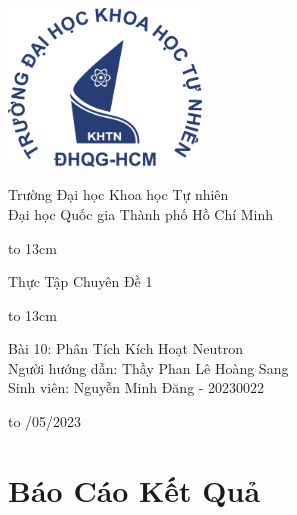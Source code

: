 \documentclass{article}
\begin{document}
\onehalfspacing
{
   \setlength{\topmargin}{-0.5cm}
\begin{titlepage}
  \begin{center}
    \centerline{\includegraphics[height=42mm]{logo}}

    
   \vspace{1cm}

        {\large Trường Đại học Khoa học Tự nhiên}\\[1em]
        {\large Đại học Quốc gia Thành phố Hồ Chí Minh}
    
        \vspace{1.2cm}
    \centerline{\hbox to 13cm{\hrulefill}}
    \vspace{0.3cm}
    \Large  {{Thực Tập Chuyên Đề 1 }}
    \centerline{\hbox to 13cm{\hrulefill}}
    
    \vspace{1.2cm}
    \Large {Bài 10: Phân Tích Kích Hoạt Neutron}\\ 
   
   \vspace{3cm}
            \large Người hướng dẫn: Thầy Phan Lê Hoàng Sang \\ 
            \large Sinh viên: Nguyễn Minh Đăng - 20230022
    
    \vspace{4cm}
    

    
    \hbox to \textwidth{\hrulefill}
    \vspace{0.2cm}
    {/05/2023}
    
  \end{center}
\end{titlepage}
}

\newpage
\clearpage\thispagestyle{empty}\addtocounter{page}{-1} 
\clearpage
\mbox{}
\newpage
%
\setcounter{section}{1}
\section*{\centering Báo Cáo Kết Quả}
\vspace{1cm}
\end{document}
